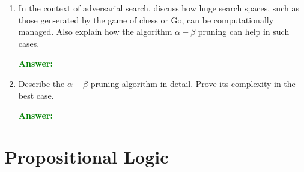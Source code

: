 \documentclass[12pt]{article}
\begin{document}
\begin{enumerate}[label=\textbf{AS.\arabic*}]
    \item In the context of adversarial search, discuss how huge search spaces, such as those gen-erated by the game of chess or Go, can be computationally managed.
    Also explain how the algorithm $\alpha - \beta$ pruning can help in such cases.

    \textcolor{green}{\textbf{Answer:}}

    \item Describe the $\alpha - \beta$ pruning algorithm in detail. Prove its complexity in the best case.
    
    \textcolor{green}{\textbf{Answer:}}
\end{enumerate}
\section{Propositional Logic}
\end{document}
